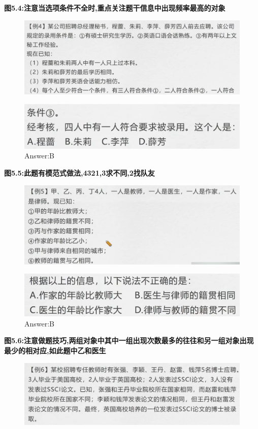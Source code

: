 \documentclass{article}
\numberwithin{equation}{section}						%
\numberwithin{figure}{section}							%
\begin{document}
\begin{sloppypar}
\textbf{图5.4:注意当选项条件不全时,重点关注题干信息中出现频率最高的对象}

\begin{figure}[H]
     \centering
     \includegraphics[width=0.6\linewidth]{192.png}
\end{figure}

\begin{figure}[H]
     \centering
     \includegraphics[width=0.45\linewidth]{193.png}
		\caption{Answer:B}
\end{figure}


\textbf{图5.5:此题有模范式做法,4321,3求不同,2找队友}

\begin{figure}[H]
     \centering
     \includegraphics[width=0.6\linewidth]{194.png}
\end{figure}

\begin{figure}[H]
     \centering
     \includegraphics[width=0.45\linewidth]{195.png}
		\caption{Answer:B}
\end{figure}

\textbf{图5.6:注意做题技巧,两组对象中其中一组出现次数最多的往往和另一组对象出现最少的相对应,如此题中乙和医生}

\begin{figure}[H]
     \centering
     \includegraphics[width=0.6\linewidth]{196.png}
\end{figure}


\end{sloppypar}
\end{document}
